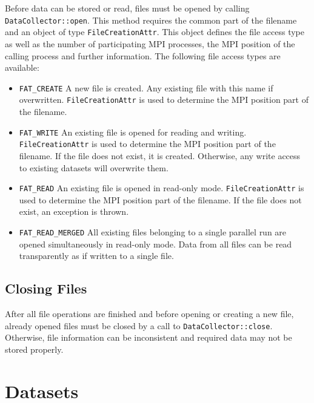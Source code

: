 \documentclass[a4paper,10pt,BCOR12mm]{report}
\begin{document}
Before data can be stored or read, files must be opened by calling
\texttt{DataCollector::open}. This method requires the common part of the filename
and an object of type \texttt{FileCreationAttr}.
This object defines the file access type as well as the number of
participating MPI processes, the MPI position of the calling process and further information.
The following file access types are available:
\begin{itemize}
	\item \texttt{FAT\_CREATE}
	A new file is created. Any existing file with this name if overwritten.
	\texttt{FileCreationAttr} is used to determine the MPI position part of the filename.

	\item \texttt{FAT\_WRITE}
	An existing file is opened for reading and writing.
	\texttt{FileCreationAttr} is used to determine the MPI position part of the filename.
	If the file does not exist, it is created.
	Otherwise, any write access to existing datasets will overwrite them.

	\item \texttt{FAT\_READ}
	An existing file is opened in read-only mode.
	\texttt{FileCreationAttr} is used to determine the MPI position part of the filename.
	If the file does not exist, an exception is thrown.

	\item \texttt{FAT\_READ\_MERGED}
	All existing files belonging to a single parallel run are opened simultaneously in read-only mode.
	Data from all files can be read transparently as if written to a single file.

\end{itemize}

\subsection{Closing Files}

After all file operations are finished and before opening or creating a new file,
already opened files must be closed by a call to \texttt{DataCollector::close}.
Otherwise, file information can be inconsistent and required data may not
be stored properly.


\section{Datasets}
\end{document}
